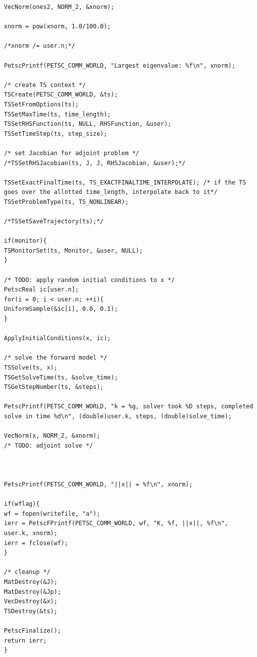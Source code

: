 \documentclass[11pt]{article}
\begin{document}
\begin{Verbatim}[xleftmargin=-3cm]
VecNorm(ones2, NORM_2, &xnorm);

xnorm = pow(xnorm, 1.0/100.0);

/*xnorm /= user.n;*/

PetscPrintf(PETSC_COMM_WORLD, "Largest eigenvalue: %f\n", xnorm);

/* create TS context */
TSCreate(PETSC_COMM_WORLD, &ts);
TSSetFromOptions(ts);
TSSetMaxTime(ts, time_length);
TSSetRHSFunction(ts, NULL, RHSFunction, &user);
TSSetTimeStep(ts, step_size);

/* set Jacobian for adjoint problem */
/*TSSetRHSJacobian(ts, J, J, RHSJacobian, &user);*/

TSSetExactFinalTime(ts, TS_EXACTFINALTIME_INTERPOLATE); /* if the TS goes over the allotted time_length, interpolate back to it*/
TSSetProblemType(ts, TS_NONLINEAR);

/*TSSetSaveTrajectory(ts);*/

if(monitor){
TSMonitorSet(ts, Monitor, &user, NULL);
}

/* TODO: apply random initial conditions to x */
PetscReal ic[user.n];
for(i = 0; i < user.n; ++i){
UniformSample(&ic[i], 0.0, 0.1);
}

ApplyInitialConditions(x, ic);

/* solve the forward model */
TSSolve(ts, x);
TSGetSolveTime(ts, &solve_time);
TSGetStepNumber(ts, &steps);

PetscPrintf(PETSC_COMM_WORLD, "k = %g, solver took %D steps, completed solve in time %d\n", (double)user.k, steps, (double)solve_time);

VecNorm(x, NORM_2, &xnorm);
/* TODO: adjoint solve */



PetscPrintf(PETSC_COMM_WORLD, "||x|| = %f\n", xnorm);

if(wflag){
wf = fopen(writefile, "a");
ierr = PetscFPrintf(PETSC_COMM_WORLD, wf, "K, %f, ||x||, %f\n", user.k, xnorm);
ierr = fclose(wf);
}

/* cleanup */
MatDestroy(&J);
MatDestroy(&Jp);
VecDestroy(&x);
TSDestroy(&ts);

PetscFinalize();
return ierr;
}
\end{Verbatim}
\end{document}
